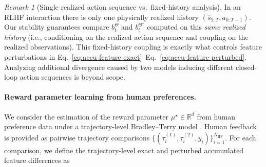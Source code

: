 \documentclass[10pt]{article} %
\theoremstyle{plain}
\theoremstyle{definition}
\theoremstyle{remark}
\newtheorem{remark}[theorem]{Remark}
\newcommand{\bR}{\mathbb{R}}
\begin{document}
 \begin{remark}[Single realized action sequence vs.\ fixed-history analysis]\label{rem:one-action-seq}
In an RLHF interaction there is only one physically realized history $(\hat s_{1:T},a_{0:T-1})$.
Our stability guarantees compare $b_t^\Theta$ and $b_t^{\Theta^\star}$ computed on this \emph{same realized history}
(i.e., conditioning on the realized action sequence and coupling on the realized observations).
This fixed-history coupling is exactly what controls feature perturbations in Eq.~\ref{eq:accu-feature-exact}--Eq.~\ref{eq:accu-feature-perturbed}.
Analyzing additional divergence caused by two models inducing different closed-loop action sequences is beyond scope.
\end{remark}

  
\paragraph{Reward parameter learning from human preferences.}
We consider the estimation of the reward parameter $\mu^\star\in\bR^d$ from human preference data under a trajectory-level Bradley--Terry model \cite{Bradley1952}. Human feedback is provided as pairwise trajectory comparisons $\{(\tau_i^{(1)},\tau_i^{(2)},y_i)\}_{i=1}^{N_{\mathrm{HF}}}$. For each comparison, we define the trajectory-level exact and perturbed accumulated feature differences as
\end{document}
